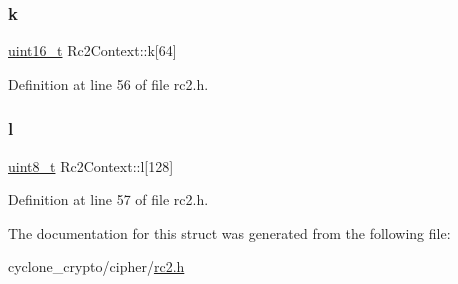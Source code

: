 \mbox{\label{structRc2Context_a5f8fb41c7bc89383e86d498556f010e4}} 
\subsubsection{\texorpdfstring{k}{k}}
{\footnotesize\ttfamily \hyperlink{stdint_8h_a273cf69d639a59973b6019625df33e30}{uint16\+\_\+t} Rc2\+Context\+::k\mbox{[}64\mbox{]}}



Definition at line 56 of file rc2.\+h.

\mbox{\label{structRc2Context_a4bae73d72c8d515d39d11364a4ff7d99}} 
\subsubsection{\texorpdfstring{l}{l}}
{\footnotesize\ttfamily \hyperlink{stdint_8h_aba7bc1797add20fe3efdf37ced1182c5}{uint8\+\_\+t} Rc2\+Context\+::l\mbox{[}128\mbox{]}}



Definition at line 57 of file rc2.\+h.



The documentation for this struct was generated from the following file\+:\begin{DoxyCompactItemize}
\item 
cyclone\+\_\+crypto/cipher/\hyperlink{rc2_8h}{rc2.\+h}\end{DoxyCompactItemize}
